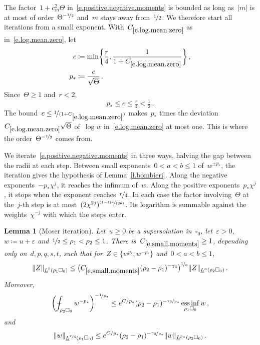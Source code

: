 \documentclass[11pt,letterpaper]{article}
\numberwithin{equation}{section}
\newtheorem{lemma}[theorem]{Lemma}
\theoremstyle{definition}
\newcommand{\eps}{\varepsilon}
\newcommand{\nf}{\nicefrac}
\newcommand{\cu}{\square}
\DeclareMathOperator*{\essinf}{ess\,inf}
\DeclarePairedDelimiter{\norm}{\lVert}{\rVert}
\def\Xint#1{\mathchoice
	{\XXint\displaystyle\textstyle{#1}}%
	{\XXint\textstyle\scriptstyle{#1}}%
	{\XXint\scriptstyle\scriptscriptstyle{#1}}%
	{\XXint\scriptscriptstyle\scriptscriptstyle{#1}}%
	\!\int}
\def\XXint#1#2#3{{\setbox0=\hbox{$#1{#2#3}{\int}$}
		\vcenter{\hbox{$#2#3$}}\kern-.5\wd0}}
\def\fint{\Xint-}
\begin{document}
The factor~$1+c_m^2\Theta$ in~\eqref{e.positive.negative.moments} is bounded as long as~$|m|$ is at most of order~$\Theta^{-\nf12}$ and~$m$ stays away from~$\nf12$. We therefore start all iterations from a small exponent. With~$C_{\eqref{e.log.mean.zero}}$ as in~\eqref{e.log.mean.zero}, let
\begin{equation}
	\begin{aligned}
		c&\coloneqq\min\biggl\{\frac r4,\frac1{1+C_{\eqref{e.log.mean.zero}}}\biggr\}\,,\\
		p_*&\coloneqq\frac c{\sqrt\Theta}\,.
	\end{aligned}
	\label{e.small.exponent}
\end{equation}
Since~$\Theta\geq1$ and~$r<2$,
\begin{equation*}
	p_*\leq c\leq\tfrac r4<\tfrac12\,.
\end{equation*}
The bound~$c\leq\nf1{(1+C_{\eqref{e.log.mean.zero}})}$ makes~$p_*$ times the deviation~$C_{\eqref{e.log.mean.zero}}\sqrt\Theta$ of~$\log w$ in~\eqref{e.log.mean.zero} at most one. This is where the order~$\Theta^{-\nf12}$ comes from.

\smallskip

We iterate~\eqref{e.positive.negative.moments} in three ways, halving the gap between the radii at each step. Between small exponents~$0<a<b\leq1$ of~$w^{\pm p_*}$, the iteration gives the hypothesis of Lemma~\ref{l.bombieri}. Along the negative exponents~$-p_*\chi^j$, it reaches the infimum of~$w$. Along the positive exponents~$p_*\chi^j$, it stops when the exponent reaches~$\nf r4$. In each case the factor involving~$\Theta$ at the~$j$-th step is at most~$(2\chi^{2j})^{\nf{(1-t)r}{(2\theta)}}$. Its logarithm is summable against the weights~$\chi^{-j}$ with which the steps enter.

\begin{lemma}[Moser iteration]
\label{l.moment.iterations}
Let~$u\geq0$ be a supersolution in~$\cu_0$, let~$\eps>0$,~$w\coloneqq u+\eps$ and~$\nf12\leq\rho_1<\rho_2\leq1$. There is~$C_{\eqref{e.small.moments}}\geq1$, depending only on~$d,p,q,s,t$, such that for~$Z\in\{w^{p_*},w^{-p_*}\}$ and~$0<a<b\leq1$,
\begin{equation}
	\norm{Z}_{\underline L^b(\rho_1\cu_0)}\leq\bigl(C_{\eqref{e.small.moments}}(\rho_2-\rho_1)^{-\gamma_6}\bigr)^{\nf1a}\norm{Z}_{\underline L^a(\rho_2\cu_0)}\,.
	\label{e.small.moments}
\end{equation}
Moreover,
\begin{equation}
	\biggl(\fint_{\rho_2\cu_0}w^{-p_*}\biggr)^{-\nf1{p_*}}\leq e^{C/p_*}(\rho_2-\rho_1)^{-\nf{\gamma_6}{p_*}}\essinf_{\rho_1\cu_0}w\,,
	\label{e.negative.moments}
\end{equation}
and
\begin{equation}
	\norm{w}_{\underline L^{\nf r4}(\rho_1\cu_0)}\leq e^{C/p_*}(\rho_2-\rho_1)^{-\nf{\gamma_6}{p_*}}\norm{w}_{\underline L^{p_*}(\rho_2\cu_0)}\,.
	\label{e.positive.moments}
\end{equation}
\end{lemma}
\end{document}
